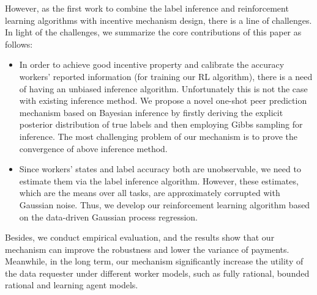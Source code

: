 However, as the first work to combine the label inference and reinforcement learning algorithms with incentive mechanism design, there is a line of challenges. In light of the challenges, we summarize the core contributions of this paper as follows:
\begin{itemize}
\item In order to achieve good incentive property and calibrate the accuracy workers' reported information (for training our RL algorithm), there is a need of having an unbiased inference algorithm. Unfortunately this is not the case with existing inference method. We propose a novel one-shot peer prediction mechanism based on Bayesian inference by firstly deriving the explicit posterior distribution of true labels and then employing Gibbs sampling for inference. The most challenging problem of our mechanism is to prove the convergence of above inference method.
\item Since workers' states and label accuracy both are unobservable, we need to estimate them via the label inference algorithm. However, these estimates, which are the means over all tasks, are approximately corrupted with Gaussian noise. Thus, we develop our reinforcement learning algorithm based on the data-driven Gaussian process regression.
%
%
\end{itemize}
Besides, we conduct empirical evaluation, and the results show that our mechanism can improve the robustness and lower the variance of payments. Meanwhile, in the long term, our mechanism significantly increase the utility of the data requester under different worker models, such as fully rational, bounded rational and learning agent models. 

